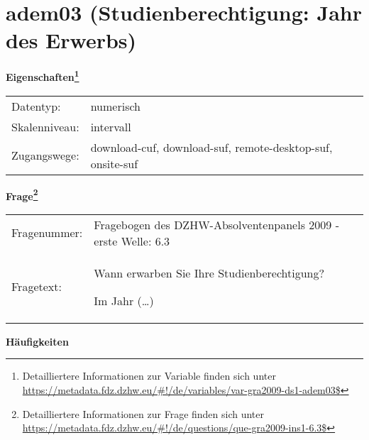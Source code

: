 
    \setcounter{footnote}{0}

    \vspace*{-1.8cm}
	\section{adem03 (Studienberechtigung: Jahr des Erwerbs)}
	\label{section:adem03}



    \vspace*{0.5cm}
    \noindent\textbf{Eigenschaften\footnote{Detailliertere Informationen zur Variable finden sich unter
		\url{https://metadata.fdz.dzhw.eu/\#!/de/variables/var-gra2009-ds1-adem03$}}}\\
	\begin{tabularx}{\hsize}{@{}lX}
	Datentyp: & numerisch \\
	Skalenniveau: & intervall \\
	Zugangswege: &
	  download-cuf, 
	  download-suf, 
	  remote-desktop-suf, 
	  onsite-suf
 \\
    \end{tabularx}



				\vspace*{0.5cm}
                \noindent\textbf{Frage\footnote{Detailliertere Informationen zur Frage finden sich unter
		              \url{https://metadata.fdz.dzhw.eu/\#!/de/questions/que-gra2009-ins1-6.3$}}}\\
				\begin{tabularx}{\hsize}{@{}lX}
					Fragenummer: &
					  Fragebogen des DZHW-Absolventenpanels 2009 - erste Welle:
					  6.3
 \\
					Fragetext: & Wann erwarben Sie Ihre Studienberechtigung?\par  Im Jahr (…) \\
				\end{tabularx}





        		\vspace*{0.5cm}
                \noindent\textbf{Häufigkeiten}

